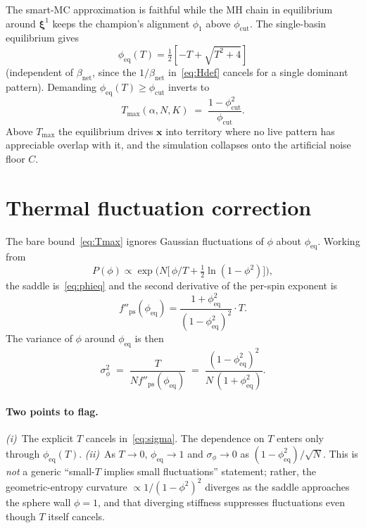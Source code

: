 \documentclass[11pt]{article}
\newcommand{\bxi}{\boldsymbol{\xi}}
\newcommand{\bx}{\mathbf{x}}
\newcommand{\Pcut}{\phi_{\mathrm{cut}}}
\newcommand{\Peq}{\phi_{\mathrm{eq}}}
\newcommand{\Tmax}{T_{\mathrm{max}}}
\begin{document}
The smart-MC approximation is faithful while the MH chain in equilibrium around $\bxi^1$ keeps the champion's alignment $\phi_1$ above $\Pcut$. The single-basin equilibrium gives
\begin{equation}
\Peq(T) = \tfrac{1}{2}\!\left[-T + \sqrt{T^2 + 4}\right]
\label{eq:phieq}
\end{equation}
(independent of $\beta_{\mathrm{net}}$, since the $1/\beta_{\mathrm{net}}$ in~\eqref{eq:Hdef} cancels for a single dominant pattern). Demanding $\Peq(T) \ge \Pcut$ inverts to
\begin{equation}
\boxed{\;\Tmax(\alpha, N, K) \;=\; \frac{1 - \Pcut^2}{\Pcut}.\;}
\label{eq:Tmax}
\end{equation}
Above $\Tmax$ the equilibrium drives $\bx$ into territory where no live pattern has appreciable overlap with it, and the simulation collapses onto the artificial noise floor $C$.

\section{Thermal fluctuation correction}

The bare bound~\eqref{eq:Tmax} ignores Gaussian fluctuations of $\phi$ about $\Peq$. Working from
\begin{equation}
P(\phi)\propto \exp\!\Big(N\big[\,\phi/T + \tfrac{1}{2}\ln(1-\phi^2)\big]\Big),
\label{eq:Pphi}
\end{equation}
the saddle is~\eqref{eq:phieq} and the second derivative of the per-spin exponent is
\begin{equation}
f''_{\mathrm{ps}}(\Peq) = \frac{1+\Peq^2}{(1-\Peq^2)^2}\cdot T.
\end{equation}
The variance of $\phi$ around $\Peq$ is then
\begin{equation}
\boxed{\;\sigma_\phi^2 \;=\; \frac{T}{N f''_{\mathrm{ps}}(\Peq)} \;=\; \frac{(1-\Peq^2)^2}{N\,(1+\Peq^2)}.\;}
\label{eq:sigma}
\end{equation}

\paragraph{Two points to flag.}
\textit{(i)}~The explicit $T$ cancels in~\eqref{eq:sigma}. The dependence on $T$ enters only through $\Peq(T)$.
\textit{(ii)}~As $T\!\to\!0$, $\Peq\!\to\!1$ and $\sigma_\phi \to 0$ as $(1-\Peq^2)/\sqrt{N}$. This is \emph{not} a generic ``small-$T$ implies small fluctuations'' statement; rather, the geometric-entropy curvature $\propto 1/(1-\phi^2)^2$ diverges as the saddle approaches the sphere wall $\phi=1$, and that diverging stiffness suppresses fluctuations even though $T$ itself cancels.
\end{document}
